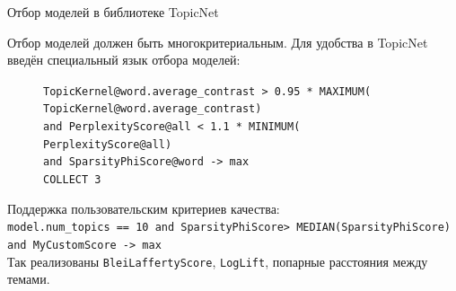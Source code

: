 \begin{frame}{Отбор моделей в библиотеке TopicNet}

Отбор моделей должен быть многокритериальным. Для удобства в TopicNet введён специальный язык отбора моделей:

\begin{figure}[ht]
\raggedright
\texttt{TopicKernel@word.average\_contrast > 0.95 * MAXIMUM( \\
\hphantom{\ \ \ \ \ \ \ \ }TopicKernel@word.average\_contrast) \\
\hphantom{\ \ } and PerplexityScore@all < 1.1 * MINIMUM( \\
\hphantom{\ \ \ \ \ \ \ \ }PerplexityScore@all) \\
\hphantom{\ \ } and SparsityPhiScore@word -> max\\
\hphantom{\ \ } COLLECT 3} \\
\label{DSL-example}
\end{figure} 
	

\bigskip
Поддержка пользовательским критериев качества:\\
\medskip
\texttt{model.num\_topics == 10 and SparsityPhiScore\@word > MEDIAN(SparsityPhiScore\@word) and MyCustomScore -> max}\\
\medskip
Так реализованы \texttt{BleiLaffertyScore}, \texttt{LogLift}, попарные расстояния между темами.
\end{frame}


